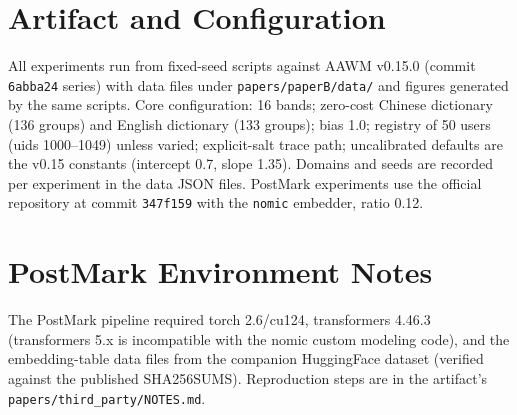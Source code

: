 \section{Artifact and Configuration}
\label{app:config}
All experiments run from fixed-seed scripts against AAWM v0.15.0 (commit
\texttt{6abba24} series) with data files under \texttt{papers/paperB/data/}
and figures generated by the same scripts. Core configuration: 16 bands;
zero-cost Chinese dictionary (136 groups) and English dictionary (133
groups); bias 1.0; registry of 50 users (uids 1000--1049) unless varied;
explicit-salt trace path; uncalibrated defaults are the v0.15 constants
(intercept 0.7, slope 1.35). Domains and seeds are recorded per experiment
in the data JSON files. PostMark experiments use the official repository
at commit \texttt{347f159} with the \texttt{nomic} embedder, ratio 0.12.

\section{PostMark Environment Notes}
The PostMark pipeline required torch 2.6/cu124, transformers 4.46.3
(transformers 5.x is incompatible with the nomic custom modeling code),
and the embedding-table data files from the companion HuggingFace dataset
(verified against the published SHA256SUMS). Reproduction steps are in the
artifact's \texttt{papers/third\_party/NOTES.md}.
